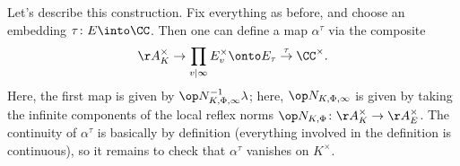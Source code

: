 \documentclass[../notes.tex]{subfiles}
\begin{document}
Let's describe this construction. Fix everything as before, and choose an embedding $\tau\colon E\into\CC$. Then one can define a map $\alpha^\tau$ via the composite
\[\AA_K^\times\to\prod_{v\mid\infty}E_v^\times\onto E_\tau\stackrel\tau\to\CC^\times.\]
Here, the first map is given by $\op N_{K,\Phi,\infty}^{-1}\lambda$; here, $\op N_{K,\Phi,\infty}$ is given by taking the infinite components of the local reflex norms $\op N_{K,\Phi}\colon\AA_K^\times\to\AA_E^\times$. The continuity of $\alpha^\tau$ is basically by definition (everything involved in the definition is continuous), so it remains to check that $\alpha^\tau$ vanishes on $K^\times$.
\end{document}
